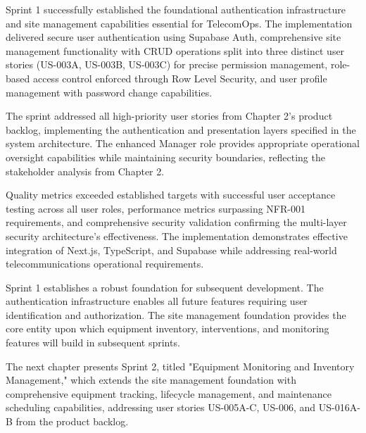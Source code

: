 Sprint 1 successfully established the foundational authentication infrastructure and site management capabilities essential for TelecomOps. The implementation delivered secure user authentication using Supabase Auth, comprehensive site management functionality with CRUD operations split into three distinct user stories (US-003A, US-003B, US-003C) for precise permission management, role-based access control enforced through Row Level Security, and user profile management with password change capabilities.

The sprint addressed all high-priority user stories from Chapter 2's product backlog, implementing the authentication and presentation layers specified in the system architecture. The enhanced Manager role provides appropriate operational oversight capabilities while maintaining security boundaries, reflecting the stakeholder analysis from Chapter 2.

Quality metrics exceeded established targets with successful user acceptance testing across all user roles, performance metrics surpassing NFR-001 requirements, and comprehensive security validation confirming the multi-layer security architecture's effectiveness. The implementation demonstrates effective integration of Next.js, TypeScript, and Supabase while addressing real-world telecommunications operational requirements.

Sprint 1 establishes a robust foundation for subsequent development. The authentication infrastructure enables all future features requiring user identification and authorization. The site management foundation provides the core entity upon which equipment inventory, interventions, and monitoring features will build in subsequent sprints.

The next chapter presents Sprint 2, titled "Equipment Monitoring and Inventory Management," which extends the site management foundation with comprehensive equipment tracking, lifecycle management, and maintenance scheduling capabilities, addressing user stories US-005A-C, US-006, and US-016A-B from the product backlog.